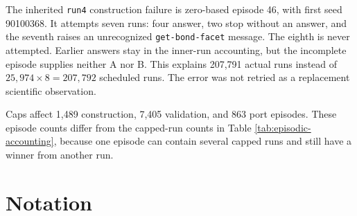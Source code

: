 \documentclass[10pt,letterpaper]{article}
\begin{document}


The inherited \texttt{run4} construction failure is zero-based episode 46, with first seed
90100368. It attempts seven runs: four answer, two stop without an answer, and the seventh
raises an unrecognized \texttt{get-bond-facet} message. The eighth is never attempted.
Earlier answers stay in the inner-run accounting, but the incomplete episode supplies
neither A nor B. This explains 207,791 actual runs instead of \(25,974\times8=207,792\)
scheduled runs. The error was not retried as a replacement scientific observation.

Caps affect 1,489 construction, 7,405 validation, and 863 port episodes. These episode
counts differ from the capped-run counts in Table \ref{tab:episodic-accounting}, because
one episode can contain several capped runs and still have a winner from another run.

\clearpage

\section{Notation}\label{app:notation}
\end{document}
